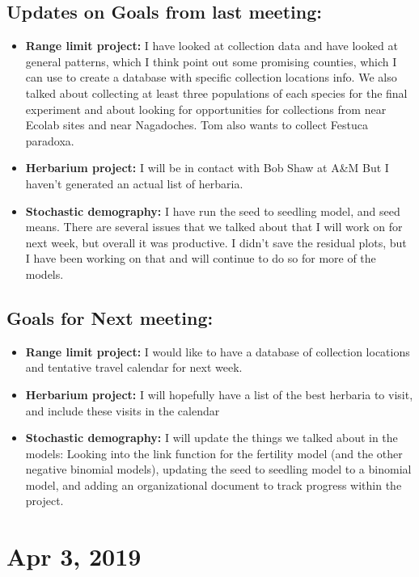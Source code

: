 \documentclass{article}
\begin{document}
\subsection*{Updates on Goals from last meeting:}
\begin{itemize}
\item{\textbf{Range limit project:} I have looked at collection data and have looked at general patterns, which I think point out some promising counties, which I can use to create a database with specific collection locations info. We also talked about collecting at least three populations of each species for the final experiment and about looking for opportunities for collections from near Ecolab sites and near Nagadoches. Tom also wants to collect Festuca paradoxa.}
\item{\textbf{Herbarium project:} I will be in contact with Bob Shaw at A\&M But I haven't generated an actual list of herbaria.}
\item{\textbf{Stochastic demography:} I have run the seed to seedling model, and seed means. There are several issues that we talked about that I will work on for next week, but overall it was productive. I didn't save the residual plots, but I have been working on that and will continue to do so for more of the models.}
\end{itemize}

\subsection*{Goals for Next meeting:}
\begin{itemize}
\item{\textbf{Range limit project:} I would like to have a database of collection locations and  tentative travel calendar for next week.}
\item{\textbf{Herbarium project:} I will hopefully have a list of the best herbaria to visit, and include these visits in the calendar}
\item{\textbf{Stochastic demography:} I will update the things we talked about in the models: Looking into the link function for the fertility model (and the other negative binomial models), updating the seed to seedling model to a binomial model, and adding an organizational document to track progress within the project.}
\end{itemize}
 

\section*{Apr 3, 2019}
\end{document}
